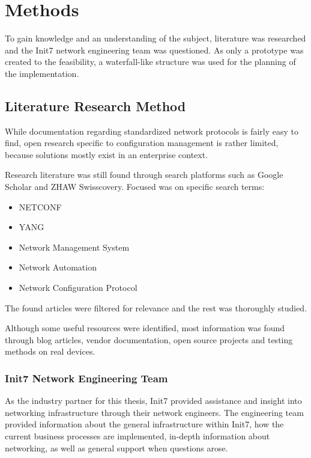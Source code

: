 \chapter{\label{methods}Methods}
\thispagestyle{fancy}


To gain knowledge and an understanding of the subject, literature was researched and
the Init7 network engineering team was questioned. As only a
prototype was created to the feasibility, a waterfall-like structure was used for
the planning of the implementation.

\section{Literature Research Method}

While documentation regarding standardized network protocols is fairly easy to find,
open research specific to configuration management is rather limited, because solutions
mostly exist in an enterprise context.

Research literature was still found through search platforms such as Google Scholar and
ZHAW Swisscovery. Focused was on specific search terms:

\begin{itemize}
  \item NETCONF
  \item YANG
  \item Network Management System
  \item Network Automation
  \item Network Configuration Protocol
\end{itemize}

The found articles were filtered for relevance and the rest was thoroughly studied.

Although some useful resources were identified, most information was found through
blog articles, vendor documentation, open source projects and testing methods on real
devices.


\subsection{Init7 Network Engineering Team}

As the industry partner for this thesis, Init7 provided assistance and insight into
networking infrastructure through their network engineers.
The engineering team provided information about the general infrastructure within Init7, 
how the current business processes are implemented, in-depth information about
networking, as well as general support when questions arose.

